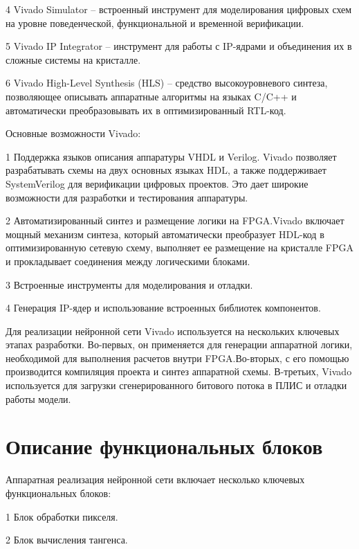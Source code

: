   4 {Vivado Simulator} – встроенный инструмент для   моделирования цифровых 
схем на уровне поведенческой, функциональной и временной верификации.

  5 {Vivado IP Integrator} – инструмент для работы с IP-ядрами и объединения их
в сложные системы на кристалле.

  6 {Vivado High-Level Synthesis (HLS)} – средство высокоуровневого синтеза, 
позволяющее описывать аппаратные алгоритмы на языках C/C++ и автоматически 
преобразовывать их в оптимизированный RTL-код.

Основные возможности Vivado:  

  1 Поддержка языков описания аппаратуры VHDL и Verilog. Vivado позволяет 
разрабатывать схемы на двух основных языках HDL, а также поддерживает 
SystemVerilog для верификации цифровых проектов. Это дает широкие 
возможности для разработки и тестирования аппаратуры.

   2 Автоматизированный синтез и размещение логики на FPGA.\@ Vivado включает 
мощный механизм синтеза, который автоматически преобразует HDL-код в 
оптимизированную сетевую схему, выполняет ее размещение на кристалле FPGA и 
прокладывает соединения между логическими блоками.

  3 Встроенные инструменты для моделирования и отладки. 

  4 Генерация IP-ядер и использование встроенных библиотек компонентов. 


Для реализации нейронной сети Vivado используется на нескольких ключевых этапах
разработки. Во-первых, он применяется для генерации аппаратной логики, 
необходимой для выполнения расчетов внутри FPGA.\@ Во-вторых, с его помощью 
производится компиляция проекта и синтез аппаратной схемы. В-третьих, Vivado 
используется для загрузки сгенерированного битового потока в ПЛИС и отладки 
работы модели.  

\section{Описание функциональных блоков}
\hspace*{12.5 mm}Аппаратная реализация нейронной сети включает несколько 
ключевых функциональных блоков:

  1 Блок обработки пикселя.

  2 Блок вычисления тангенса.

